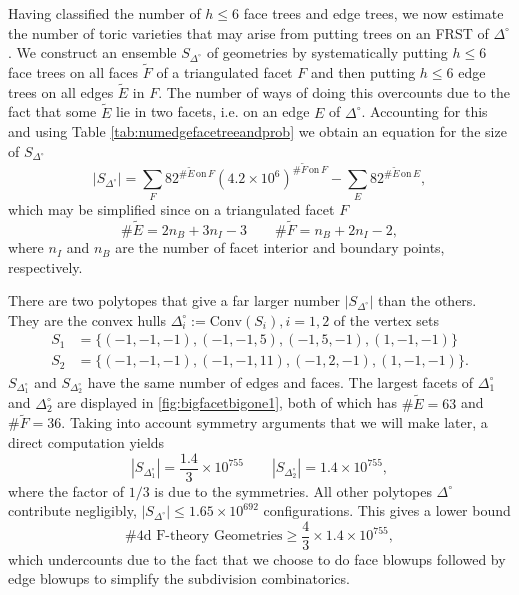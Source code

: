 \documentclass[aps,prl,twocolumn, superscriptaddress,groupedaddress,nofootinbib]{revtex4-1}
\newcommand{\sdoc}{S_{\Delta_1^\circ}}
\newcommand{\sdtc}{S_{\Delta_2^\circ}}
\begin{document}
\vspace{.5cm}
Having classified the number of $h\leq 6$ face trees and edge trees, we now estimate 
the number of toric varieties that may arise from putting trees on an FRST of 
$\Delta^\circ$. 
We construct an ensemble $S_{\Delta^\circ}$ of geometries by systematically putting $h\leq 6$ face trees on all
faces $\tilde F$ of a triangulated facet $F$ and then putting $h\leq 6$ edge trees on
all edges $\tilde E$ in $F$. The number of ways of doing this overcounts
due to the fact that some
$\tilde E$ lie in two facets, i.e. on an edge $E$ of $\Delta^\circ$. Accounting
for this and using Table \ref{tab:numedgefacetreeandprob} we obtain an equation for the size of $S_{\Delta^\circ}$
\begin{equation}
|S_{\Delta^\circ}| = \sum_F 82^{\# \tilde E \, \text{on} \, F} (4.2\times 10^6)^{\# \tilde F \, \text{on} \, F} - \sum_E 82^{\# \tilde E \, \text{on} \, E},
\end{equation}
which may be simplified since on a triangulated facet $F$
\begin{equation}
\#\tilde E = 2n_B + 3n_I - 3 \qquad \# \tilde F = n_B+2n_I-2,
\end{equation}
where $n_I$ and $n_B$ are the number of facet interior and boundary points,
respectively. 

There are two polytopes that give a far larger number $|S_{\Delta^\circ}|$
than the others. They
are  the convex hulls $\Delta_i^\circ := \text{Conv}(S_i), i=1,2$ of the
vertex sets
\begin{align} 
S_1 &= \{ (-1,-1,-1),(-1,-1,5),(-1,5,-1),(1,-1,-1)\} \nonumber \\
S_2 &= \{ (-1,-1,-1),(-1,-1,11),(-1,2,-1),(1,-1,-1)\}.
\end{align}
$\sdoc$ and $\sdtc$ have the same number of edges and faces. 
The largest facets of $\Delta_1^\circ$ and $\Delta_2^\circ$ are displayed in \ref{fig:bigfacetbigone1}, 
both of which has $\# \tilde E = 63$ and $\# \tilde F=36$. Taking into
account symmetry arguments that we will make later, a 
direct computation
yields
\begin{equation}
|\sdoc| = \frac{1.4}{3} \times 10^{755} \qquad |\sdtc| = 1.4 \times 10^{755},
\label{eqn:sdocsdtccounts}
\end{equation}
where the factor of $1/3$ is due to the symmetries.
All other polytopes $\Delta^\circ$ contribute negligibly, 
$|S_{\Delta^\circ}| \leq 1.65\times 10^{692}$
configurations. This gives a lower bound
\begin{equation}
\text{\# 4d F-theory Geometries} \geq \frac43 \times 1.4 \times 10^{755},
\end{equation}
which undercounts due to the fact that we choose to do face blowups followed by
edge blowups to simplify the subdivision combinatorics.
\end{document}
